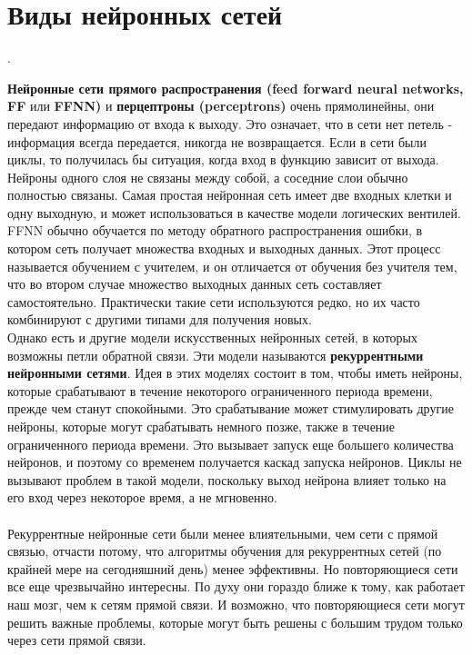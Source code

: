 \section{Виды нейронных сетей}.

 \textbf{Нейронные сети прямого распространения 
(feed forward neural networks, FF} или \textbf{FFNN)} и 
\textbf{перцептроны (perceptrons)} очень прямолинейны, они передают информацию от входа к выходу. Это означает, что в сети нет петель - информация всегда передается, никогда не возвращается. Если в сети были циклы, то получилась бы ситуация, когда вход в функцию зависит от выхода. Нейроны одного слоя не связаны между собой, а соседние слои обычно полностью связаны. Самая простая нейронная сеть имеет две входных клетки и одну выходную, и может использоваться в качестве модели логических вентилей. FFNN обычно обучается по методу обратного распространения ошибки, в котором сеть получает множества входных и выходных данных. Этот процесс называется обучением с учителем, и он отличается от обучения без учителя тем, что во втором случае множество выходных данных сеть составляет самостоятельно. Практически такие сети используются редко, но их часто комбинируют с другими типами для получения новых. \\

Однако есть и другие модели искусственных нейронных сетей, в которых возможны петли обратной связи. Эти модели называются \textbf{рекуррентными нейронными сетями}. Идея в этих моделях состоит в том, чтобы иметь нейроны, которые срабатывают в течение некоторого ограниченного периода времени, прежде чем станут спокойными. Это срабатывание может стимулировать другие нейроны, которые могут срабатывать немного позже, также в течение ограниченного периода времени. Это вызывает запуск еще большего количества нейронов, и поэтому со временем получается каскад запуска нейронов. Циклы не вызывают проблем в такой модели, поскольку выход нейрона влияет только на его вход через некоторое время, а не мгновенно. \\ \\

Рекуррентные нейронные сети были менее влиятельными, чем сети с прямой связью, отчасти потому, что алгоритмы обучения для рекуррентных сетей (по крайней мере на сегодняшний день) менее эффективны. Но повторяющиеся сети все еще чрезвычайно интересны. По духу они гораздо ближе к тому, как работает наш мозг, чем к сетям прямой связи. И возможно, что повторяющиеся сети могут решить важные проблемы, которые могут быть решены с большим трудом только через сети прямой связи. \\ \\

